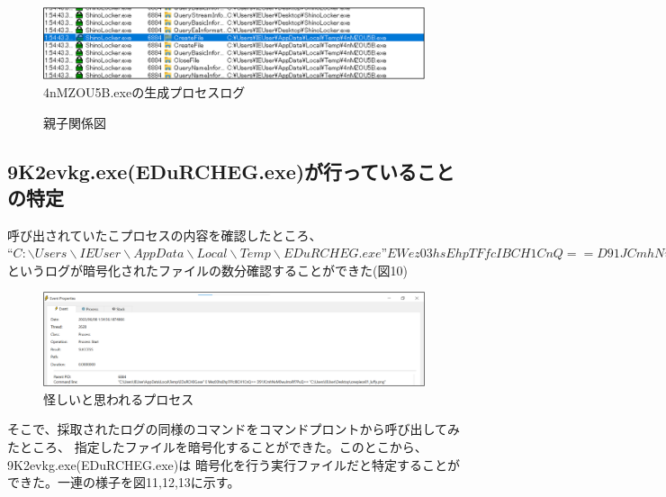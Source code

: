 \documentclass[dvipdfmx,autodetect-engine]{jsarticle}
\begin{document}
\begin{figure}[H]
  \centering
  \includegraphics[scale=0.6]{pic9.png}
  \caption{4nMZOU5B.exeの生成プロセスログ}
\end{figure}

\begin{figure}[H]
  \centering
  \caption{親子関係図}
\end{figure}

\subsection{9K2evkg.exe(EDuRCHEG.exe)が行っていることの特定}

呼び出されていたこプロセスの内容を確認したところ、\\
\begin{math}
  “C:\backslash Users\backslash IEUser\backslash AppData\backslash Local\backslash Temp\backslash EDuRCHEG.exe” E Wez03hsEhpTFfcIBCH1CnQ
== D91JCmhNvM0wuImxRf7PuQ== “暗号化されたファイルのパス”
\end{math}
\\というログが暗号化されたファイルの数分確認することができた(図10)

\begin{figure}[H]
  \centering
  \includegraphics[scale=0.4]{pic10.png}
  \caption{怪しいと思われるプロセス}
\end{figure}

そこで、採取されたログの同様のコマンドをコマンドプロントから呼び出してみたところ、
指定したファイルを暗号化することができた。このとこから、9K2evkg.exe(EDuRCHEG.exe)は
暗号化を行う実行ファイルだと特定することができた。一連の様子を図11,12,13に示す。
\end{document}

